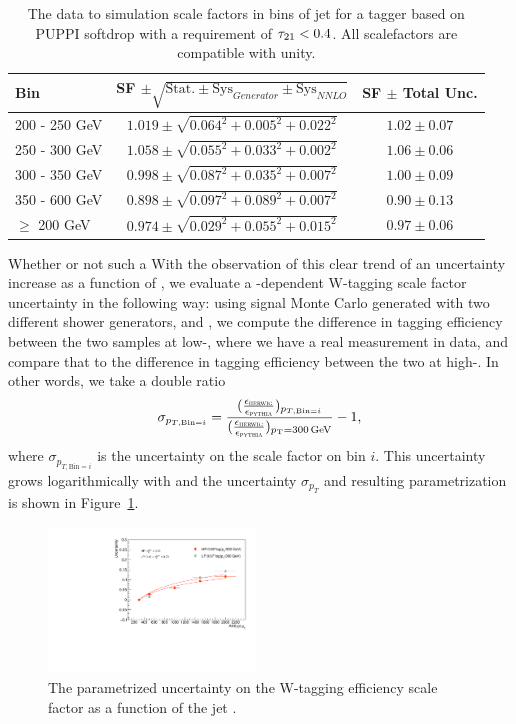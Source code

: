 \begin{table}[h!]
    \centering
    \begin{tabular}{|l|c|c|}
    \hline
     Bin & SF $\pm \sqrt{\textrm{Stat.} \pm \textrm{Sys}_{Generator} \pm \textrm{Sys}_{NNLO}}$ & SF $\pm$ Total Unc. \\
\hline
200 - 250 GeV  & $1.019  \pm \sqrt{ 0.064^2 + 0.005^2 + 0.022^2 }$ & $1.02 \pm 0.07$\\
250 - 300 GeV  & $1.058  \pm \sqrt{ 0.055^2 + 0.033^2 + 0.002^2 }$ & $1.06 \pm 0.06$\\
300 - 350 GeV  & $0.998  \pm \sqrt{ 0.087^2 + 0.035^2 + 0.007^2 }$ & $1.00 \pm 0.09$\\
350 - 600 GeV  & $0.898  \pm \sqrt{ 0.097^2 + 0.089^2 + 0.007^2 }$ & $0.90 \pm 0.13$\\
\hline
$\geq$ 200 GeV & $0.974  \pm \sqrt{ 0.029^2 + 0.055^2 + 0.015^2 }$ & $0.97 \pm 0.06$\\
    \hline
    \end{tabular}
    \caption{The data to simulation scale factors in bins of jet \PT for a tagger based on PUPPI softdrop with a requirement of $\tau_{21}<0.4$. All scalefactors are compatible with unity.}
    \label{tab:searchIII:sfptdep}
 \end{table}
Whether or not such a With the observation of this clear trend of an uncertainty increase as a function of \PT, we evaluate a \PT-dependent W-tagging scale factor uncertainty in the following way: using signal Monte Carlo generated with two different shower generators,  and \HERWIG{++}, we compute the difference in tagging efficiency between the two samples at low-\PT, where we have a real measurement in data, and compare that to the difference in tagging efficiency between the two at high-\PT. In other words, we take a double ratio 
\begin{equation}
  \sigma_{p_{T,\textrm{Bin}=i}}=\frac{ (\frac{\epsilon_{{\textsc{herwig}}}}{\epsilon_{{\textsc{pythia}}}})_{p_{T,\textrm{Bin}=i}}} {(\frac{\epsilon_{{\textsc{herwig}}}}{\epsilon_{{\textsc{pythia}}}})_{p_{\mathrm{T}}=300 \,\text{Ge\hspace{-.08em}V}}}-1,
  \end{equation}
where $\sigma_{p_{T,\textrm{Bin}=i}}$ is the uncertainty on the scale factor on \PT bin $i$. This uncertainty grows logarithmically with \PT and the uncertainty $\sigma_{p_{T}}$ and resulting parametrization is shown in Figure~\ref{fig:searchIII:tau21ptdep}.
 \begin{figure}[h!]
 \centering
 \includegraphics[width=0.49\textwidth]{figures/vtagging/2017_sf/ptdep.pdf}
 \caption{The parametrized uncertainty on the W-tagging efficiency scale factor as a function of the jet \PT.}
 \label{fig:searchIII:tau21ptdep}
 \end{figure}
